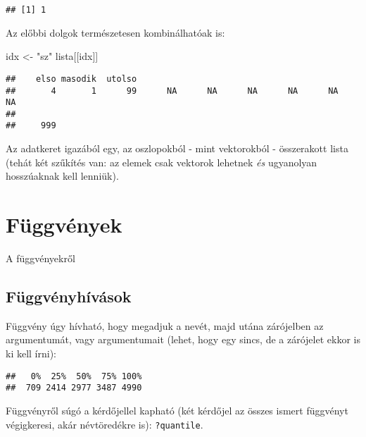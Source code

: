 \documentclass[]{book}
\newenvironment{Shaded}{\begin{snugshade}}{\end{snugshade}}
\newcommand{\KeywordTok}[1]{\textcolor[rgb]{0.13,0.29,0.53}{\textbf{#1}}}
\newcommand{\NormalTok}[1]{#1}
\newcommand{\OperatorTok}[1]{\textcolor[rgb]{0.81,0.36,0.00}{\textbf{#1}}}
\newcommand{\StringTok}[1]{\textcolor[rgb]{0.31,0.60,0.02}{#1}}
\begin{document}
\begin{verbatim}
## [1] 1
\end{verbatim}

Az előbbi dolgok természetesen kombinálhatóak is:

\begin{Shaded}
\begin{Highlighting}[]
\NormalTok{idx <-}\StringTok{ "sz"}
\NormalTok{lista[[idx]]}
\end{Highlighting}
\end{Shaded}

\begin{verbatim}
##    elso masodik  utolso                                                 
##       4       1      99      NA      NA      NA      NA      NA      NA 
##         
##     999
\end{verbatim}

Az adatkeret igazából egy, az oszlopokból - mint vektorokból - összerakott lista (tehát két szűkítés van: az elemek csak vektorok lehetnek \emph{és} ugyanolyan hosszúaknak kell lenniük).

\hypertarget{fuxfcggvuxe9nyek}{%
\chapter{Függvények}\label{fuxfcggvuxe9nyek}}

A függvényekről

\hypertarget{fuxfcggvuxe9nyhuxedvuxe1sok}{%
\section{Függvényhívások}\label{fuxfcggvuxe9nyhuxedvuxe1sok}}

Függvény úgy hívható, hogy megadjuk a nevét, majd utána zárójelben az argumentumát, vagy argumentumait (lehet, hogy egy sincs, de a zárójelet ekkor is ki kell írni):

\begin{Shaded}
\end{Shaded}

\begin{verbatim}
##   0%  25%  50%  75% 100% 
##  709 2414 2977 3487 4990
\end{verbatim}

Függvényről súgó a kérdőjellel kapható (két kérdőjel az összes ismert függvényt végigkeresi, akár névtöredékre is): \texttt{?quantile}.
\end{document}
